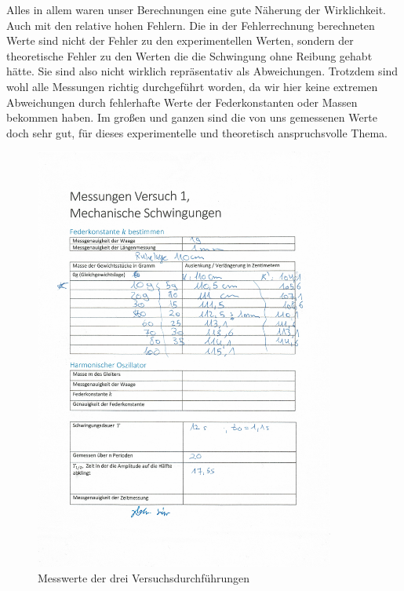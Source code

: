 \documentclass{article}
\begin{document}
              Alles in allem waren unser Berechnungen eine gute Näherung der Wirklichkeit. Auch mit den relative hohen Fehlern.
              Die in der Fehlerrechnung berechneten Werte sind nicht der Fehler zu den experimentellen Werten, sondern der theoretische Fehler zu
              den Werten die die Schwingung ohne Reibung gehabt hätte. Sie sind also nicht wirklich repräsentativ als Abweichungen.
              Trotzdem sind wohl alle Messungen richtig durchgeführt worden, da wir hier keine extremen Abweichungen durch fehlerhafte Werte
              der Federkonstanten oder Massen bekommen haben.
              Im großen und ganzen sind die von uns gemessenen Werte doch sehr gut, für dieses experimentelle und theoretisch anspruchsvolle Thema.


              \begin{figure}[!ht]\label{fig:Messwerte1}
                  \centering
                  \includegraphics[height=14cm]{fotos/messwerte1_bild.jpg}
                  \caption{Messwerte der drei Versuchsdurchführungen}
              \end{figure}
\end{document}
